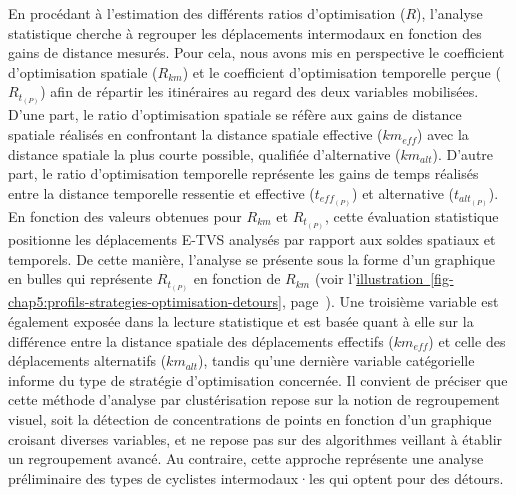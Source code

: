 \begin{refsegment}
En procédant à l'estimation des différents ratios d'optimisation (\(R\)), l'analyse statistique cherche à regrouper les déplacements intermodaux en fonction des gains de distance mesurés. Pour cela, nous avons mis en perspective le coefficient d'optimisation spatiale (\(R_{km}\)) et le coefficient d'optimisation temporelle perçue (\(R_{t_{(P)}}\)) afin de répartir les itinéraires au regard des deux variables mobilisées. D'une part, le ratio d'optimisation spatiale se réfère aux gains de distance spatiale réalisés en confrontant la distance spatiale effective (\(km_{eff}\)) avec la distance spatiale la plus courte possible, qualifiée d'alternative (\(km_{alt}\)). D'autre part, le ratio d'optimisation temporelle représente les gains de temps réalisés entre la distance temporelle ressentie et effective (\(t_{eff_{(P)}}\)) et alternative (\(t_{alt_{(P)}}\)). En fonction des valeurs obtenues pour \(R_{km}\) et \(R_{t_{(P)}}\), cette évaluation statistique positionne les déplacements \acrshort{E-TVS} analysés par rapport aux soldes spatiaux et temporels. De cette manière, l'analyse se présente sous la forme d'un graphique en bulles qui représente \(R_{t_{(P)}}\) en fonction de \(R_{km}\) (voir l'\hyperref[fig-chap5:profils-strategies-optimisation-detours]{illustration~\ref{fig-chap5:profils-strategies-optimisation-detours}}, page~\pageref{fig-chap5:profils-strategies-optimisation-detours}). Une troisième variable est également exposée dans la lecture statistique et est basée quant à elle sur la différence entre la distance spatiale des déplacements effectifs (\(km_{eff}\)) et celle des déplacements alternatifs (\(km_{alt}\)), tandis qu'une dernière variable catégorielle informe du type de stratégie d'optimisation concernée. Il convient de préciser que cette méthode d'analyse par clustérisation repose sur la notion de regroupement visuel, soit la détection de concentrations de points en fonction d'un graphique croisant diverses variables, et ne repose pas sur des algorithmes veillant à établir un regroupement avancé. Au contraire, cette approche représente une analyse préliminaire des types de cyclistes intermodaux·les qui optent pour des détours.%


\end{refsegment}
